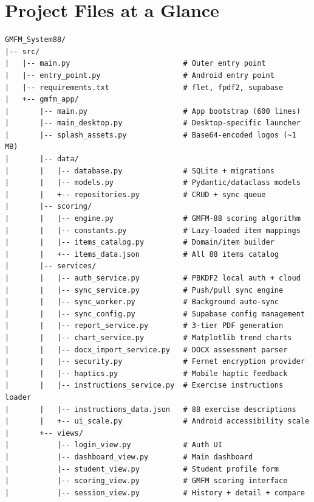 \documentclass[12pt,a4paper]{article}
\begin{document}
\section{Project Files at a Glance}

\begin{lstlisting}[basicstyle=\ttfamily\scriptsize, frame=none, backgroundcolor=\color{codebg}]
GMFM_System88/
|-- src/
|   |-- main.py                          # Outer entry point
|   |-- entry_point.py                   # Android entry point
|   |-- requirements.txt                 # flet, fpdf2, supabase
|   +-- gmfm_app/
|       |-- main.py                      # App bootstrap (600 lines)
|       |-- main_desktop.py              # Desktop-specific launcher
|       |-- splash_assets.py             # Base64-encoded logos (~1 MB)
|       |-- data/
|       |   |-- database.py              # SQLite + migrations
|       |   |-- models.py                # Pydantic/dataclass models
|       |   +-- repositories.py          # CRUD + sync queue
|       |-- scoring/
|       |   |-- engine.py                # GMFM-88 scoring algorithm
|       |   |-- constants.py             # Lazy-loaded item mappings
|       |   |-- items_catalog.py         # Domain/item builder
|       |   +-- items_data.json          # All 88 items catalog
|       |-- services/
|       |   |-- auth_service.py          # PBKDF2 local auth + cloud
|       |   |-- sync_service.py          # Push/pull sync engine
|       |   |-- sync_worker.py           # Background auto-sync
|       |   |-- sync_config.py           # Supabase config management
|       |   |-- report_service.py        # 3-tier PDF generation
|       |   |-- chart_service.py         # Matplotlib trend charts
|       |   |-- docx_import_service.py   # DOCX assessment parser
|       |   |-- security.py              # Fernet encryption provider
|       |   |-- haptics.py               # Mobile haptic feedback
|       |   |-- instructions_service.py  # Exercise instructions loader
|       |   |-- instructions_data.json   # 88 exercise descriptions
|       |   +-- ui_scale.py              # Android accessibility scale
|       +-- views/
|           |-- login_view.py            # Auth UI
|           |-- dashboard_view.py        # Main dashboard
|           |-- student_view.py          # Student profile form
|           |-- scoring_view.py          # GMFM scoring interface
|           |-- session_view.py          # History + detail + compare

\end{lstlisting}
\end{document}
